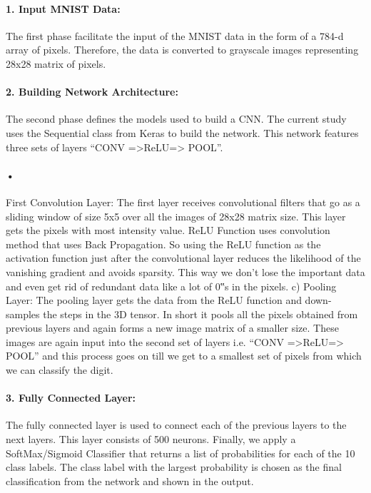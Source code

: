 \documentclass{article}
\begin{document}
\paragraph{1. Input MNIST Data:}
  The first phase facilitate the input of the MNIST data in the form of a 784-d array of pixels. Therefore, the data is converted to grayscale images representing 28x28 matrix of pixels. 
\paragraph{2. Building Network Architecture:}
  The second phase defines the models used to build a CNN. The current study uses the Sequential class from Keras to build the network. This network features three sets of layers “CONV =>ReLU=> POOL”. 
\paragraph{•}
First Convolution Layer: The first layer receives convolutional filters that go as a sliding window of size 5x5 over all the images of 28x28 matrix size. This layer gets the pixels with most intensity value. ReLU Function uses convolution method that uses Back Propagation. So using the ReLU function as the activation function just after the convolutional layer reduces the likelihood of the vanishing gradient and avoids sparsity. This way we don’t lose the important data and even get rid of redundant data like a lot of 0‟s in the pixels. c) Pooling Layer: The pooling layer gets the data from the ReLU function and down-samples the steps in the 3D tensor. In short it pools all the pixels obtained from previous layers and again forms a new image matrix of a smaller size. These images are again input into the second set of layers i.e. “CONV =>ReLU=> POOL” and this process goes on till we get to a smallest set of pixels from which we can classify the digit. 
\paragraph{3. Fully Connected Layer: }
The fully connected layer is used to connect each of the previous layers to the next layers. This layer consists of 500 neurons. Finally, we apply a SoftMax/Sigmoid Classifier that returns a list of probabilities for each of the 10 class labels. The class label with the largest probability is chosen as the final classification from the network and shown in the output. 
\end{document}
